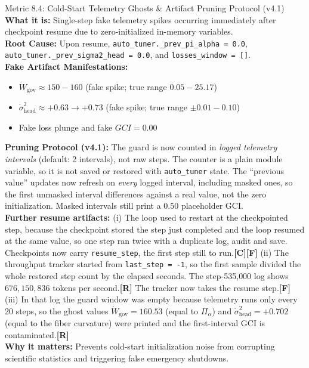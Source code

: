 \documentclass[11pt,a4paper]{article}
\newcommand{\sR}{\textbf{[R]}}
\newcommand{\sC}{\textbf{[C]}}
\newcommand{\sF}{\textbf{[F]}}
\begin{document}
\begin{metricbox}{Metric 8.4: Cold-Start Telemetry Ghosts \& Artifact Pruning Protocol (v4.1)}
\textbf{What it is:} Single-step fake telemetry spikes occurring immediately after checkpoint resume due to zero-initialized in-memory variables.\\
\textbf{Root Cause:} Upon resume, \texttt{auto\_tuner.\_prev\_pi\_alpha = 0.0}, \texttt{auto\_tuner.\_prev\_sigma2\_head = 0.0}, and \texttt{losses\_window = []}.\\
\textbf{Fake Artifact Manifestations:}
\begin{itemize}[leftmargin=*]
    \item $\dot{W}_{\text{gov}} \approx 150 - 160$ (fake spike; true range $0.05 - 25.17$)
    \item $\dot{\sigma}^2_{\text{head}} \approx +0.63 \to +0.73$ (fake spike; true range $\pm 0.01 - 0.10$)
    \item Fake loss plunge and fake $GCI = 0.00$ \end{itemize}
\textbf{Pruning Protocol (v4.1):} The guard is now counted in \emph{logged telemetry intervals} (default: 2 intervals), not raw steps. The counter is a plain module variable, so it is not saved or restored with \texttt{auto\_tuner} state. The ``previous value'' updates now refresh on \emph{every} logged interval, including masked ones, so the first unmasked interval differences against a real value, not the zero initialization. Masked intervals still print a $0.50$ placeholder GCI.\\
\textbf{Further resume artifacts:} (i) The loop used to restart at the checkpointed step, because the checkpoint stored the step just completed and the loop resumed at the same value, so one step ran twice with a duplicate log, audit and save. Checkpoints now carry \texttt{resume\_step}, the first step still to run.\sC{}\sF{} (ii) The throughput tracker started from \texttt{last\_step = -1}, so the first sample divided the whole restored step count by the elapsed seconds. The step-535{,}000 log shows $676{,}150{,}836$ tokens per second.\sR{} The tracker now takes the resume step.\sF{} (iii) In that log the guard window was empty because telemetry runs only every 20 steps, so the ghost values $\dot{W}_{\text{gov}} = 160.53$ (equal to $\Pi_\alpha$) and $\dot\sigma^2_{\text{head}} = +0.702$ (equal to the fiber curvature) were printed and the first-interval GCI is contaminated.\sR{}\\
\textbf{Why it matters:} Prevents cold-start initialization noise from corrupting scientific statistics and triggering false emergency shutdowns.
\end{metricbox}
\end{document}

